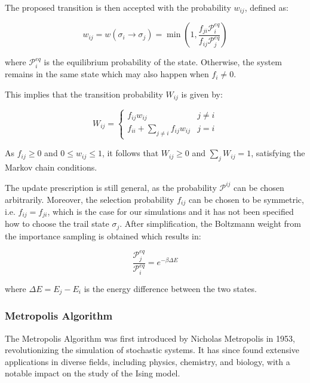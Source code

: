 The proposed transition is then accepted with the probability \( w_{ij} \),
defined as:

\begin{equation}
    w_{ij} = w(\sigma_i \rightarrow \sigma_j) = \min \left( 1, \frac{f_{ji} \mathcal{P}^{eq}_i}{f_{ij} \mathcal{P}^{eq}_j} \right)
\end{equation}

where \( \mathcal{P}^{eq}_i \) is the equilibrium probability of the state.
Otherwise, the system remains in the same state which may also happen when \(
f_{i} \neq 0 \).

This implies that the transition probability \( W_{ij} \) is given by:

\begin{equation}
    W_{ij} =
    \begin{cases}
        f_{ij} w_{ij} & j \neq i \\
        f_{ii} + \sum_{j \neq i} f_{ij} w_{ij} & j = i
    \end{cases}
\end{equation}

As $f_{ij} \geq 0$ and $0 \leq w_{ij} \leq 1$, it follows that $W_{ij} \geq 0$
and $\sum_j W_{ij} = 1$, satisfying the Markov chain conditions.

The update prescription is still general, as the probability \( \mathcal{P}^{ij}
\) can be chosen arbitrarily. Moreover, the selection probability \( f_{ij} \)
can be chosen to be symmetric, i.e. \( f_{ij} = f_{ji} \), which is the case for
our simulations and it has not been specified how to choose the trail state \(
\sigma_j \). After simplification, the Boltzmann weight from the importance
sampling is obtained which results in:

\begin{equation}
    \frac{\mathcal{P}_j^{eq}}{\mathcal{P}_i^{eq}} = e^{-\beta \Delta E}
\end{equation}

where \( \Delta E = E_j - E_i \) is the energy difference between the two
states.

\subsubsection{Metropolis Algorithm}

The Metropolis Algorithm was first introduced by Nicholas Metropolis
\cite{Metropolis1953} in 1953, revolutionizing the simulation of stochastic
systems. It has since found extensive applications in diverse fields, including
physics, chemistry, and biology, with a notable impact on the study of the Ising
model.

